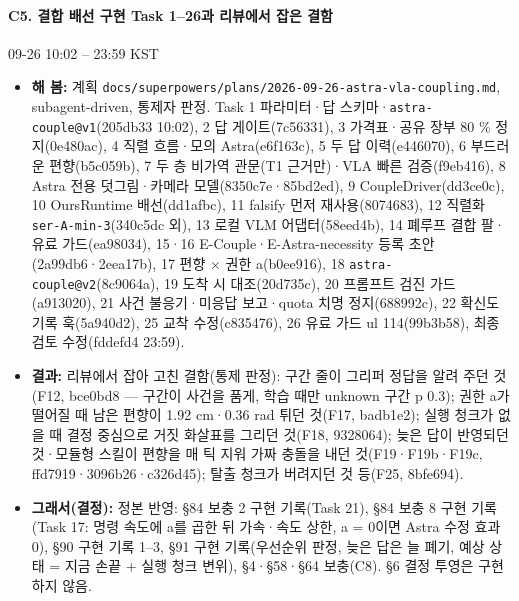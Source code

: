 \paragraph{C5. 결합 배선 구현 Task 1--26과 리뷰에서 잡은 결함}
{\small 09-26 10:02 -- 23:59 KST}
\begin{itemize}
  \item \textbf{해 봄:} 계획 \texttt{docs/\allowbreak{}superpowers/\allowbreak{}plans/\allowbreak{}2026-\allowbreak{}09-\allowbreak{}26-\allowbreak{}astra-\allowbreak{}vla-\allowbreak{}coupling.\allowbreak{}md}, subagent-driven, 통제자 판정. Task 1 파라미터·답 스키마·\texttt{astra-\allowbreak{}couple@v1}(205db33 10:02), 2 답 게이트(7c56331), 3 가격표·공유 장부 80 \% 정지(0e480ac), 4 직렬 흐름·모의 Astra(e6f163c), 5 두 답 이력(e446070), 6 부드러운 편향(b5c059b), 7 두 층 비가역 관문(T1 근거만)·VLA 빠른 검증(f9eb416), 8 Astra 전용 덧그림·카메라 모델(8350c7e·85bd2ed), 9 CoupleDriver(dd3ce0c), 10 OursRuntime 배선(dd1afbc), 11 falsify 먼저 재사용(8074683), 12 직렬화 \texttt{ser-\allowbreak{}A-\allowbreak{}min-\allowbreak{}3}(340c5dc 외), 13 로컬 VLM 어댑터(58eed4b), 14 폐루프 결합 팔·유료 가드(ea98034), 15·16 E-Couple·E-Astra-necessity 등록 초안(2a99db6·2eea17b), 17 편향 $\times$ 권한 a(b0ee916), 18 \texttt{astra-\allowbreak{}couple@v2}(8c9064a), 19 도착 시 대조(20d735c), 20 프롬프트 검진 가드(a913020), 21 사건 불응기·미응답 보고·quota 치명 정지(688992c), 22 확신도 기록 훅(5a940d2), 25 교착 수정(c835476), 26 유료 가드 ul 114(99b3b58), 최종 검토 수정(fddefd4 23:59).
  \item \textbf{결과:} 리뷰에서 잡아 고친 결함(통제 판정): 구간 줄이 그리퍼 정답을 알려 주던 것(F12, bce0bd8 --- 구간이 사건을 품게, 학습 때만 unknown 구간 p 0.3); 권한 a가 떨어질 때 남은 편향이 1.92 cm·0.36 rad 튀던 것(F17, badb1e2); 실행 청크가 없을 때 결정 중심으로 거짓 화살표를 그리던 것(F18, 9328064); 늦은 답이 반영되던 것·모듈형 스킬이 편향을 매 틱 지워 가짜 충돌을 내던 것(F19·F19b·F19c, ffd7919·3096b26·c326d45); 탈출 청크가 버려지던 것 등(F25, 8bfe694).
  \item \textbf{그래서(결정):} 정본 반영: §84 보충 2 구현 기록(Task 21), §84 보충 8 구현 기록(Task 17: 명령 속도에 a를 곱한 뒤 가속·속도 상한, a = 0이면 Astra 수정 효과 0), §90 구현 기록 1--3, §91 구현 기록(우선순위 판정, 늦은 답은 늘 폐기, 예상 상태 = 지금 손끝 + 실행 청크 변위), §4·§58·§64 보충(C8). §6 결정 투영은 구현하지 않음.
\end{itemize}

